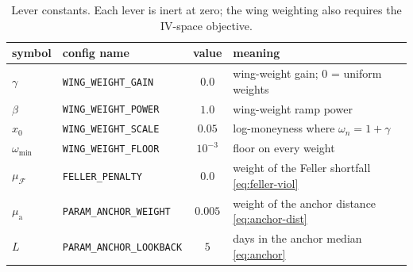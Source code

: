\documentclass[a4paper, 11pt, reqno]{amsart}
\newcommand{\ConstWingGainSym}{\gamma}                   \newcommand{\ConstWingGainVal}{0.0}
\newcommand{\ConstWingPowerSym}{\beta}                   \newcommand{\ConstWingPowerVal}{1.0}
\newcommand{\ConstWingScaleSym}{x_0}                     \newcommand{\ConstWingScaleVal}{0.05}
\newcommand{\ConstWingFloorSym}{\omega_{\min}}           \newcommand{\ConstWingFloorVal}{10^{-3}}
\newcommand{\ConstFellerPenaltySym}{\mu_{\mathcal{F}}}   \newcommand{\ConstFellerPenaltyVal}{0.0}
\newcommand{\ConstAnchorWeightSym}{\mu_{\mathrm{a}}}     \newcommand{\ConstAnchorWeightVal}{0.005}
\newcommand{\ConstAnchorLookbackSym}{L}                  \newcommand{\ConstAnchorLookbackVal}{5}
\begin{document}
		\begin{table}[H]
		\centering
		\small
		\begin{tabular}{llcl}
			\toprule
			symbol & config name & value & meaning \\
			\midrule
			$\ConstWingGainSym$       & \texttt{WING\_WEIGHT\_GAIN}     & $\ConstWingGainVal$       & wing-weight gain; $0$ = uniform weights \\
			$\ConstWingPowerSym$      & \texttt{WING\_WEIGHT\_POWER}    & $\ConstWingPowerVal$      & wing-weight ramp power \\
			$\ConstWingScaleSym$      & \texttt{WING\_WEIGHT\_SCALE}    & $\ConstWingScaleVal$      & log-moneyness where $\omega_n=1+\ConstWingGainSym$ \\
			$\ConstWingFloorSym$      & \texttt{WING\_WEIGHT\_FLOOR}    & $\ConstWingFloorVal$      & floor on every weight \\
			$\ConstFellerPenaltySym$  & \texttt{FELLER\_PENALTY}        & $\ConstFellerPenaltyVal$  & weight of the Feller shortfall \eqref{eq:feller-viol} \\
			$\ConstAnchorWeightSym$   & \texttt{PARAM\_ANCHOR\_WEIGHT}  & $\ConstAnchorWeightVal$   & weight of the anchor distance \eqref{eq:anchor-dist} \\
			$\ConstAnchorLookbackSym$ & \texttt{PARAM\_ANCHOR\_LOOKBACK} & $\ConstAnchorLookbackVal$ & days in the anchor median \eqref{eq:anchor} \\
			\bottomrule
		\end{tabular}
		\vspace*{-0.8em}
		\caption{Lever constants. Each lever is inert at zero; the wing weighting also requires the
		IV-space objective.}\label{tab:levers}
		\end{table}
\end{document}
